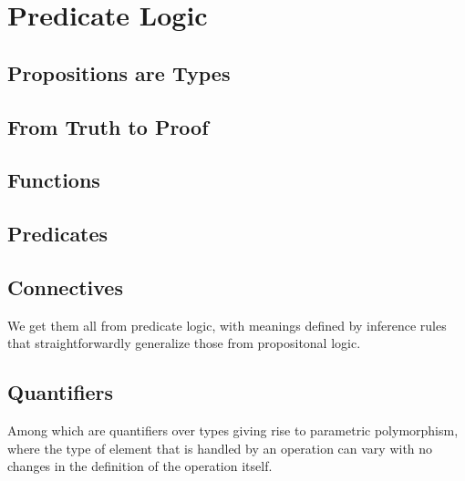 \documentclass[letterpaper,10pt,english]{sphinxmanual}
\begin{document}
\chapter{Predicate Logic}
\label{\detokenize{A_02_Predicate_Logic:predicate-logic}}\label{\detokenize{A_02_Predicate_Logic:introduction}}\label{\detokenize{A_02_Predicate_Logic::doc}}

\section{Propositions are Types}
\label{\detokenize{A_02_Predicate_Logic:propositions-are-types}}

\section{From Truth to Proof}
\label{\detokenize{A_02_Predicate_Logic:from-truth-to-proof}}

\section{Functions}
\label{\detokenize{A_02_Predicate_Logic:functions}}

\section{Predicates}
\label{\detokenize{A_02_Predicate_Logic:predicates}}

\section{Connectives}
\label{\detokenize{A_02_Predicate_Logic:connectives}}
\sphinxAtStartPar
We get them all from predicate logic, with meanings
defined by inference rules that straightforwardly
generalize those from propositonal logic.

\begin{sphinxVerbatim}[commandchars=\\\{\}]
   
\end{sphinxVerbatim}


\section{Quantifiers}
\label{\detokenize{A_02_Predicate_Logic:quantifiers}}
\sphinxAtStartPar
Among which are quantifiers over types giving rise to
parametric polymorphism, where the type of element that
is handled by an operation can vary with no changes in
the definition of the operation itself.
\end{document}
